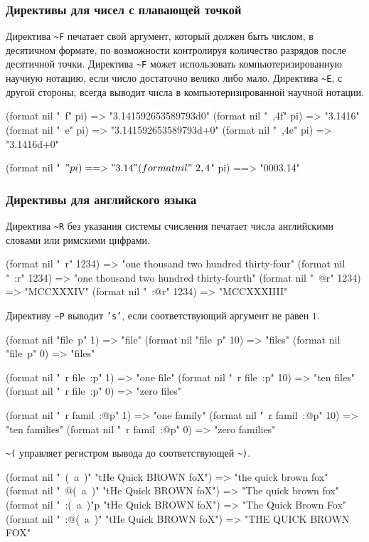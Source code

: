 \subsubsection{Директивы для чисел с плавающей точкой}
Директива \lstinline{~F} печатает свой аргумент, который должен быть числом, в десятичном формате, по возможности контролируя количество разрядов после десятичной точки. Директива \lstinline{~F} может использовать компьютеризированную научную нотацию, если число достаточно велико либо мало. Директива \lstinline{~E}, с другой стороны, всегда выводит числа в компьютеризированной научной нотации.
\begin{cllst}{}{}
(format nil "~f" pi)   => "3.141592653589793d0"
(format nil "~,4f" pi) => "3.1416"
(format nil "~e" pi)   => "3.141592653589793d+0"
(format nil "~,4e" pi) => "3.1416d+0"

(format nil "~$" pi) ==> "3.14"
(format nil "~2,4$" pi) ==> "0003.14"
\end{cllst}

\subsubsection{Директивы для английского языка}
Директива \lstinline{~R} без указания системы счисления печатает числа английскими словами или римскими цифрами. 
\begin{cllst}{}{}
(format nil "~r" 1234)   => "one thousand two hundred thirty-four"
(format nil "~:r" 1234)  => "one thousand two hundred thirty-fourth"
(format nil "~@r" 1234)  => "MCCXXXIV"
(format nil "~:@r" 1234) => "MCCXXXIIII"
\end{cllst}

Директиву \lstinline{~P} выводит \texttt{'s'}, если соответствующий аргумент не равен $1$.
\begin{cllst}{}{}
(format nil "file~p" 1)  => "file"
(format nil "file~p" 10) => "files"
(format nil "file~p" 0)  => "files"

(format nil "~r file~:p" 1)  => "one file"
(format nil "~r file~:p" 10) => "ten files"
(format nil "~r file~:p" 0)  => "zero files"

(format nil "~r famil~:@p" 1)  => "one family"
(format nil "~r famil~:@p" 10) => "ten families"
(format nil "~r famil~:@p" 0)  => "zero families"
\end{cllst}

\lstinline{~(} управляет регистром вывода до соответствующей \lstinline{~)}.
\begin{cllst}{}{}
(format nil "~(~a~)" "tHe Quick BROWN foX")   => "the quick brown fox"
(format nil "~@(~a~)" "tHe Quick BROWN foX")  => "The quick brown fox"
(format nil "~:(~a~)"p "tHe Quick BROWN foX") => "The Quick Brown Fox"
(format nil "~:@(~a~)" "tHe Quick BROWN foX") => "THE QUICK BROWN FOX"
\end{cllst}

